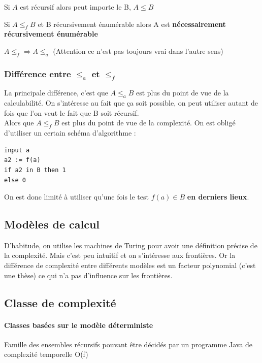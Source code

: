 \begin{myprop}
	Si $A$ est récursif alors peut importe le B, $A \leq B$
\end{myprop}

\begin{myprop}
	Si $A \leq_f B$ et B récursivement énumérable alors A est
	\textbf{nécessairement récursivement énumérable}
\end{myprop}

\begin{myprop}
	$A\leq_f \Rightarrow A\leq_a$ (Attention ce n'est pas toujours vrai 
	dans l'autre sens)
\end{myprop}

\subsubsection{Différence entre $\leq_a$ et $\leq_f$}
La principale différence, c'est que $A \leq_a B$ est plus du point de vue de la 
calculabilité. On s'intéresse au fait que ça soit possible, on peut utiliser 
autant de fois que l'on veut le fait que B soit récursif. \\
Alors que $A \leq_f B$ est plus du point de vue de la complexité. On est 
obligé d'utiliser un certain schéma d'algorithme :

\begin{lstlisting}
input a
a2 := f(a)
if a2 in B then 1
else 0
\end{lstlisting}

On est donc limité à utiliser qu'une fois le test $f(a) \in B$ \textbf{en 
	derniers lieux}.

\subsection{Modèles de calcul}
D'habitude, on utilise les machines de Turing pour avoir une définition précise 
de la complexité. Mais c'est peu intuitif et on s'intéresse aux frontières. Or la 
différence de complexité entre différents modèles est un facteur polynomial 
(c'est une thèse) ce qui n'a pas d'influence sur les frontières.

\subsection{Classe de complexité}

\paragraph{Classes basées sur le modèle déterministe}
\begin{mydef}[DTIME(f)]
	Famille des ensembles récursifs pouvant être décidés par un programme 
	Java de complexité temporelle O(f)
\end{mydef}

